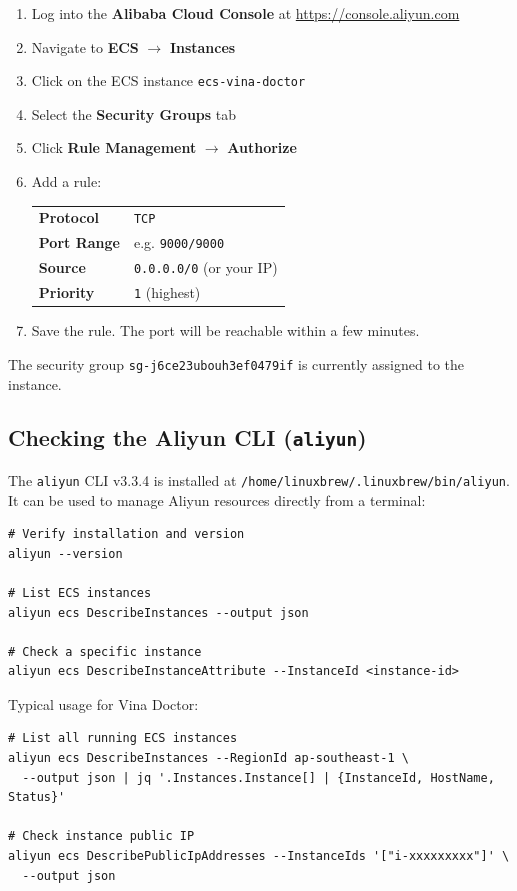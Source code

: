 \documentclass[12pt,a4paper]{article}
\begin{document}
\begin{enumerate}
	\item Log into the \textbf{Alibaba Cloud Console} at \url{https://console.aliyun.com}
	\item Navigate to \textbf{ECS} $\rightarrow$ \textbf{Instances}
	\item Click on the ECS instance \texttt{ecs-vina-doctor}
	\item Select the \textbf{Security Groups} tab
	\item Click \textbf{Rule Management} $\rightarrow$ \textbf{Authorize}
	\item Add a rule:
	      \begin{tabular}{m{3cm}m{9cm}}
		      \textbf{Protocol}   & \texttt{TCP}                    \\
		      \textbf{Port Range} & e.g. \texttt{9000/9000}         \\
		      \textbf{Source}     & \texttt{0.0.0.0/0} (or your IP) \\
		      \textbf{Priority}   & \texttt{1} (highest)            \\
	      \end{tabular}
	\item Save the rule. The port will be reachable within a few minutes.
\end{enumerate}

The security group \texttt{sg-j6ce23ubouh3ef0479if} is currently assigned to
the instance.

\subsection{Checking the Aliyun CLI (\texttt{aliyun})}

The \texttt{aliyun} CLI v3.3.4 is installed at
\texttt{/home/linuxbrew/.linuxbrew/bin/aliyun}. It can be used to manage
Aliyun resources directly from a terminal:

\begin{verbatim}
# Verify installation and version
aliyun --version

# List ECS instances
aliyun ecs DescribeInstances --output json

# Check a specific instance
aliyun ecs DescribeInstanceAttribute --InstanceId <instance-id>
\end{verbatim}

Typical usage for Vina Doctor:

\begin{verbatim}
# List all running ECS instances
aliyun ecs DescribeInstances --RegionId ap-southeast-1 \
  --output json | jq '.Instances.Instance[] | {InstanceId, HostName, Status}'

# Check instance public IP
aliyun ecs DescribePublicIpAddresses --InstanceIds '["i-xxxxxxxxx"]' \
  --output json
\end{verbatim}
\end{document}
